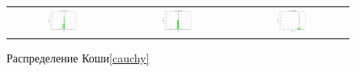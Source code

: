 \documentclass[a4paper,14pt]{article}
\begin{document}
	\begin{figure}[H]
		\centering
		\begin{tabular}{c c c}
			\includegraphics[height = 0.25\textheight, width = 0.31\textwidth]{../image/lab1/lab1_cauchy_10.png}
			& \includegraphics[height = 0.25\textheight, width = 0.31\textwidth]{../image/lab1/lab1_cauchy_50.png}
			& \includegraphics[height = 0.25\textheight, width = 0.31\textwidth]{../image/lab1/lab1_cauchy_1000.png}
		\end{tabular}
		\caption{Распределение Коши\eqref{cauchy}}
		\label{fig:cauchy}
	\end{figure}
	
\end{document}
